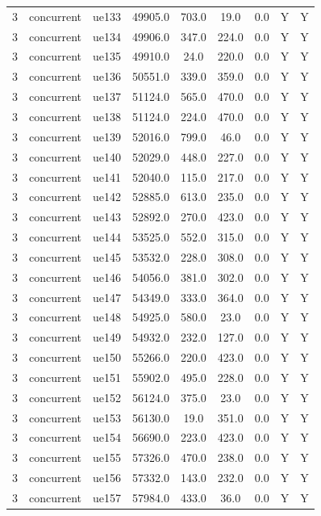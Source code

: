 \begin{table}[ht]
\begin{tabular}{|c|c|c|c|c|c|c|c|c|}
3 & concurrent & ue133 & 49905.0 & 703.0 & 19.0 & 0.0 & Y & Y \\
3 & concurrent & ue134 & 49906.0 & 347.0 & 224.0 & 0.0 & Y & Y \\
3 & concurrent & ue135 & 49910.0 & 24.0 & 220.0 & 0.0 & Y & Y \\
3 & concurrent & ue136 & 50551.0 & 339.0 & 359.0 & 0.0 & Y & Y \\
3 & concurrent & ue137 & 51124.0 & 565.0 & 470.0 & 0.0 & Y & Y \\
3 & concurrent & ue138 & 51124.0 & 224.0 & 470.0 & 0.0 & Y & Y \\
3 & concurrent & ue139 & 52016.0 & 799.0 & 46.0 & 0.0 & Y & Y \\
3 & concurrent & ue140 & 52029.0 & 448.0 & 227.0 & 0.0 & Y & Y \\
3 & concurrent & ue141 & 52040.0 & 115.0 & 217.0 & 0.0 & Y & Y \\
3 & concurrent & ue142 & 52885.0 & 613.0 & 235.0 & 0.0 & Y & Y \\
3 & concurrent & ue143 & 52892.0 & 270.0 & 423.0 & 0.0 & Y & Y \\
3 & concurrent & ue144 & 53525.0 & 552.0 & 315.0 & 0.0 & Y & Y \\
3 & concurrent & ue145 & 53532.0 & 228.0 & 308.0 & 0.0 & Y & Y \\
3 & concurrent & ue146 & 54056.0 & 381.0 & 302.0 & 0.0 & Y & Y \\
3 & concurrent & ue147 & 54349.0 & 333.0 & 364.0 & 0.0 & Y & Y \\
3 & concurrent & ue148 & 54925.0 & 580.0 & 23.0 & 0.0 & Y & Y \\
3 & concurrent & ue149 & 54932.0 & 232.0 & 127.0 & 0.0 & Y & Y \\
3 & concurrent & ue150 & 55266.0 & 220.0 & 423.0 & 0.0 & Y & Y \\
3 & concurrent & ue151 & 55902.0 & 495.0 & 228.0 & 0.0 & Y & Y \\
3 & concurrent & ue152 & 56124.0 & 375.0 & 23.0 & 0.0 & Y & Y \\
3 & concurrent & ue153 & 56130.0 & 19.0 & 351.0 & 0.0 & Y & Y \\
3 & concurrent & ue154 & 56690.0 & 223.0 & 423.0 & 0.0 & Y & Y \\
3 & concurrent & ue155 & 57326.0 & 470.0 & 238.0 & 0.0 & Y & Y \\
3 & concurrent & ue156 & 57332.0 & 143.0 & 232.0 & 0.0 & Y & Y \\
3 & concurrent & ue157 & 57984.0 & 433.0 & 36.0 & 0.0 & Y & Y \\

\end{tabular}
\end{table}
